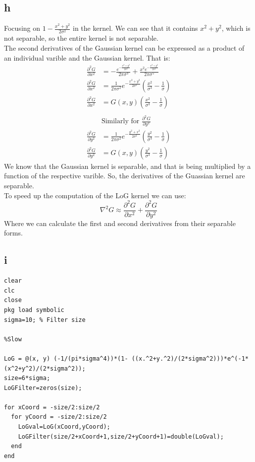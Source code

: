 \documentclass[11pt]{article}
\begin{document}
\subsection{h}
\label{sec:orgf5ae7bf}
Focusing on \(1-\frac{x^2+y^2}{2\sigma^2}\) in the kernel. We can see that it contains \(x^2+y^2\), which is not separable, so the entire kernel is not separable. \\
The second derivatives of the Gaussian kernel can be expressed as a product of an individual varible and the Gaussian kernel. That is:
\begin{align*}
\frac{\partial^2 G}{\partial x^2}&=-\frac{e^{-\frac{ x^{2} + y^2}{2 \sigma^{2}}}}{2 \pi \sigma^{3}} + \frac{x^{2} e^{-\frac{ x^{2} + y^2}{2 \sigma^{2}}}}{2 \pi \sigma^{5}} \\
\frac{\partial^2 G}{\partial x^2}&=\frac{1}{2\pi\sigma^2}e^{-\frac{x^2+y^2}{2\sigma^2}} \left( \frac{x^2}{\sigma^3}-\frac{1}{\sigma}\right) \\
\frac{\partial^2 G}{\partial x^2}&=G(x,y)\left( \frac{x^2}{\sigma^3}-\frac{1}{\sigma}\right) \\
& \\
& \textrm{Similarly for } \frac{\partial^2 G}{\partial y^2}\\
\frac{\partial^2 G}{\partial y^2}&=\frac{1}{2\pi\sigma^2}e^{-\frac{y^2+x^2}{2\sigma^2}} \left( \frac{y^2}{\sigma^3}-\frac{1}{\sigma}\right) \\
\frac{\partial^2 G}{\partial y^2}&=G(x,y)\left( \frac{y^2}{\sigma^3}-\frac{1}{\sigma}\right)
\end{align*}
We know that the Gaussian kernel is separable, and that is being multiplied by a function of the respective varible. So, the derivatives of the Guassian kernel are separable.\\
To speed up the computation of the LoG kernel we can use:
\[\nabla^2 G\approx \frac{\partial^2 G}{\partial x^2} + \frac{\partial^2 G}{\partial y^2}\]
Where we can calculate the first and second derivatives from their separable forms.
\subsection{i}
\label{sec:org80b9b11}
\begin{verbatim}
clear
clc
close
pkg load symbolic
sigma=10; % Filter size

%Slow

LoG = @(x, y) (-1/(pi*sigma^4))*(1- ((x.^2+y.^2)/(2*sigma^2)))*e^(-1*(x^2+y^2)/(2*sigma^2));
size=6*sigma;
LoGFilter=zeros(size);

for xCoord = -size/2:size/2
  for yCoord = -size/2:size/2
    LoGval=LoG(xCoord,yCoord);
    LoGFilter(size/2+xCoord+1,size/2+yCoord+1)=double(LoGval);
  end
end


\end{verbatim}
\end{document}
